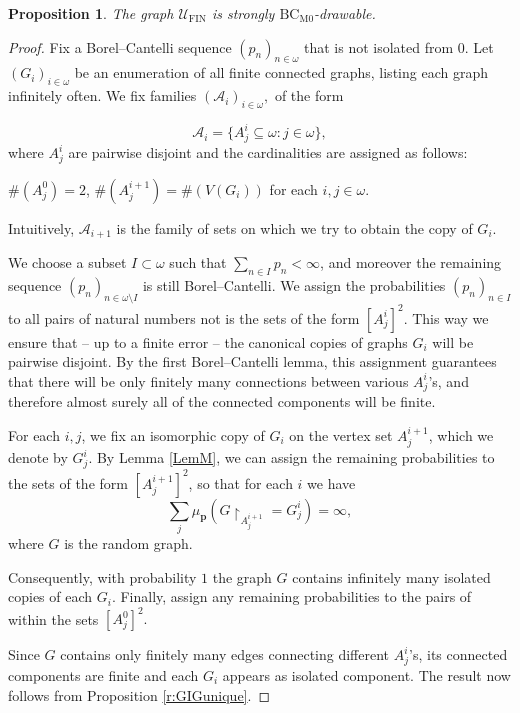 \documentclass{amsart}
\newtheorem{prop}[theorem]{Proposition}
\theoremstyle{plain}
\theoremstyle{definition}
\theoremstyle{remark}
\numberwithin{equation}{section}
\newcommand{\on}{\operatorname}
\newcommand{\UU}{\mathcal{U}}
\newcommand{\s}{\subseteq}
\DeclareMathOperator{\fin}{FIN}
\begin{document}
\begin{prop}\label{prop:GIG}
The graph $\UU_{\fin}$ is strongly $\on{BC_{M0}}$-drawable.
\end{prop}
\begin{proof}
    Fix a Borel--Cantelli sequence $(p_n)_{n\in \omega}$ that is not isolated from $0$. Let $(G_i)_{i\in \omega}$ be an enumeration of all finite connected graphs, listing each graph infinitely often. We fix families
    $(\mathcal{A}_i)_{i\in \omega},$
    of the form
    
    $$\mathcal{A}_i=\{A^i_j \s \omega:j\in\omega\},$$ 
    where
    $A_j^i$ are pairwise disjoint and the cardinalities are assigned as follows:
    
    \(\#(A^0_j)=2\),
    \(\#(A^{i+1}_j)=\#(V(G_i))\) for each \(i, j \in \omega\). 
    
    Intuitively, \(\mathcal{A}_{i+1}\) is the family of sets on which we try to obtain the copy of $G_i$. 
    
    We choose a subset $I\subset \omega$ such that $\sum\limits_{n\in I} p_{n}<\infty$, and moreover the remaining sequence $(p_n)_{n\in \omega \setminus I}$ is still Borel--Cantelli. We  assign the probabilities $(p_{n})_{n\in I}$
    to all pairs of natural numbers not is the sets of the form $[A^i_j]^2$. This way we ensure that -- up to a finite error -- the canonical copies of graphs $G_i$ will be pairwise disjoint. By the first Borel--Cantelli lemma, this assignment guarantees that there will be only finitely many connections between various $A^i_j$'s, and therefore almost surely all of the connected components will be finite. 
    
    For each \(i,j\), we fix an isomorphic copy of $G_i$ on the vertex set \(A^{i+1}_j\), which we denote by \(G^i_j\). By Lemma \ref{LemM}, we can assign the remaining probabilities to the sets of the form
    $[A^{i+1}_j]^2$,
    so that for each $i$ we have $$\sum\limits_j \mu_{\textbf{p}} (G\upharpoonright_{A^{i+1}_j}=G^i_j)=\infty,$$ where $G$ is the random graph. 
    
    Consequently, with probability $1$ the graph $G$ contains infinitely many isolated copies of each $G_i$. Finally, assign any remaining probabilities to the pairs of within the sets
    $[A^0_j]^2.$ 
    
    Since $G$ contains only finitely many edges connecting different $A^i_j$'s, its connected components are finite and each $G_i$ appears as isolated component. The result now follows from Proposition \ref{r:GIGunique}. \end{proof}
\end{document}
